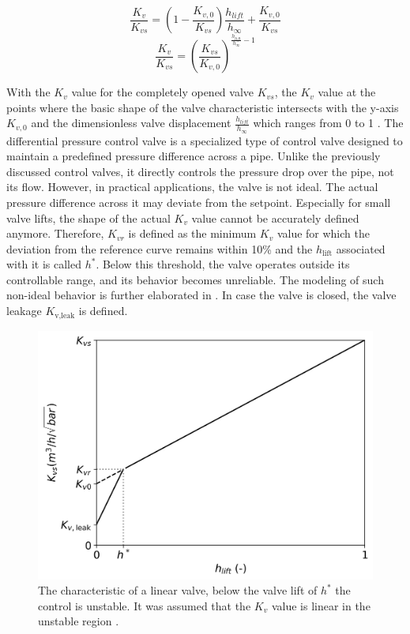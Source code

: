 \begin{equation}\label{eq::linear2valve}
    \frac{K_v}{K_{vs}} = \left( 1 -\frac{K_{v,0}}{K_{vs}} \right) \frac{h_{lift}}{h_{\infty}} + \frac{K_{v,0}}{K_{vs}}
\end{equation}
\begin{equation}\label{eq::equalpercentvalve}
    \frac{K_v}{K_{vs}} = {\left(\frac{K_{vs}}{K_{v,0}} \right)}^{\frac{h_{lift}}{h_{\infty}} - 1}
\end{equation}

With the $K_v$ value for the completely opened valve $K_{vs}$, the $K_v$ value at the points where the basic shape of the valve characteristic intersects with the y-axis $K_{v,0}$ and the dimensionless valve displacement $\frac{h_{lift}}{h_{\infty}}$ which ranges from 0 to 1 \cite{Artikelphdchris}. The differential pressure control valve is a specialized type of control valve designed to maintain a predefined pressure difference across a pipe. Unlike the previously discussed control valves, it directly controls the pressure drop over the pipe, not its flow. However, in practical applications, the valve is not ideal. The actual pressure difference across it may deviate from the setpoint. Especially for small valve lifts, the shape of the actual $K_v$ value cannot be accurately defined anymore. Therefore, $K_{vr}$ is defined as the minimum $K_v$ value for which the deviation from the reference curve remains within 10\% and the $h_{\text{lift}}$ associated with it is called $h^{*}$. Below this threshold, the valve operates outside its controllable range, and its behavior becomes unreliable. The modeling of such non-ideal behavior is further elaborated in \cite{echtephdthesis}. In case the valve is closed, the valve leakage $K_{\text{v,leak}}$ is defined.  

\begin{figure}[h!]
    \centering
    \includegraphics[width=0.65\linewidth]{Literature Survey - DCSC template/figuresLIT/Kvs_plot.png}
    \caption{The characteristic of a linear valve, below the valve lift of $h^*$ the control is unstable. It was assumed that the $K_v$ value is linear in the unstable region \cite{echtephdthesis}.}
    \label{fig:enter-label}
\end{figure}


